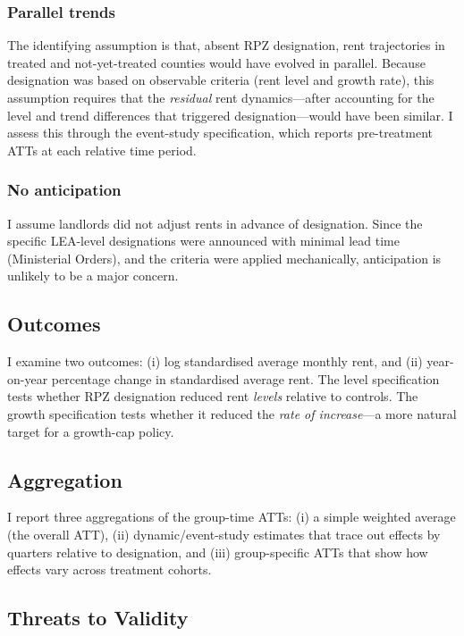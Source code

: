 \documentclass[12pt]{article}
\begin{document}
\subsubsection*{Parallel trends} The identifying assumption is that, absent RPZ designation, rent trajectories in treated and not-yet-treated counties would have evolved in parallel. Because designation was based on observable criteria (rent level and growth rate), this assumption requires that the \textit{residual} rent dynamics---after accounting for the level and trend differences that triggered designation---would have been similar. I assess this through the event-study specification, which reports pre-treatment ATTs at each relative time period.

\subsubsection*{No anticipation} I assume landlords did not adjust rents in advance of designation. Since the specific LEA-level designations were announced with minimal lead time (Ministerial Orders), and the criteria were applied mechanically, anticipation is unlikely to be a major concern.

\subsection{Outcomes}

I examine two outcomes: (i) log standardised average monthly rent, and (ii) year-on-year percentage change in standardised average rent. The level specification tests whether RPZ designation reduced rent \textit{levels} relative to controls. The growth specification tests whether it reduced the \textit{rate of increase}---a more natural target for a growth-cap policy.

\subsection{Aggregation}

I report three aggregations of the group-time ATTs: (i) a simple weighted average (the overall ATT), (ii) dynamic/event-study estimates that trace out effects by quarters relative to designation, and (iii) group-specific ATTs that show how effects vary across treatment cohorts.

\subsection{Threats to Validity}
\end{document}
